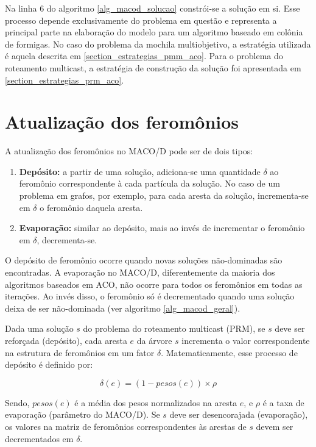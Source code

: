 Na linha 6 do algoritmo \ref{alg_macod_solucao} constrói-se a solução em si. Esse processo depende exclusivamente do problema em questão e representa a principal parte na elaboração do modelo para um algoritmo baseado em colônia de formigas. No caso do problema da mochila multiobjetivo, a estratégia utilizada é aquela descrita em \ref{section_estrategias_pmm_aco}. Para o problema do roteamento multicast, a estratégia de construção da solução foi apresentada em \ref{section_estrategias_prm_aco}.

\section{Atualização dos feromônios}
\label{section_macod_pheromones}

A atualização dos feromônios no MACO/D pode ser de dois tipos:

\begin{enumerate}
	\item \textbf{Depósito:} a partir de uma solução, adiciona-se uma quantidade $\delta$ ao feromônio correspondente à cada partícula da solução. No caso de um problema em grafos, por exemplo, para cada aresta da solução, incrementa-se em $\delta$ o feromônio daquela aresta.
	\item \textbf{Evaporação:} similar ao depósito, mais ao invés de incrementar o feromônio em $\delta$, decrementa-se.
\end{enumerate}

O depósito de feromônio ocorre quando novas soluções não-dominadas são encontradas. A evaporação no MACO/D, diferentemente da maioria dos algoritmos baseados em ACO, não ocorre para todos os feromônios em todas as iterações. Ao invés disso, o feromônio só é decrementado quando uma solução deixa de ser não-dominada (ver algoritmo \ref{alg_macod_geral}).

Dada uma solução $s$ do problema do roteamento multicast (PRM), se $s$ deve ser reforçada (depósito), cada aresta $e$ da árvore $s$ incrementa o valor correspondente na estrutura de feromônios em um fator $\delta$. Matematicamente, esse processo de depósito é definido por:

\[\delta(e) = (1 - pesos(e)) \times \rho\]

Sendo, $pesos(e)$ é a média dos pesos normalizados na aresta $e$, e $\rho$ é a taxa de evaporação (parâmetro do MACO/D). Se $s$ deve ser desencorajada (evaporação), os valores na matriz de feromônios correspondentes às arestas de $s$ devem ser decrementados em $\delta$.

